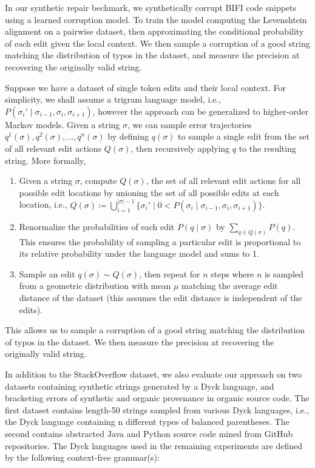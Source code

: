 \documentclass[sigplan,review,anonymous,acmsmall]{acmart}\settopmatter{printfolios=false,printccs=false,printacmref=false}
\begin{document}
  In our synthetic repair bechmark, we synthetically corrupt BIFI code snippets using a learned corruption model. To train the model computing the Levenshtein alignment on a pairwise dataset, then approximating the conditional probability of each edit given the local context. We then sample a corruption of a good string matching the distribution of typos in the dataset, and measure the precision at recovering the originally valid string.

  Suppose we have a dataset of single token edits and their local context. For simplicity, we shall assume a trigram language model, i.e., $P(\sigma_i' \mid \sigma_{i-1}, \sigma_i, \sigma_{i+1})$, however the approach can be generalized to higher-order Markov models. Given a string $\sigma$, we can sample error trajectories $q^1(\sigma), q^2(\sigma), \ldots, q^n(\sigma)$ by defining $q(\sigma)$ to sample a single edit from the set of all relevant edit actions $Q(\sigma)$, then recursively applying $q$ to the resulting string. More formally,

  \begin{enumerate}
    \item Given a string $\sigma$, compute $Q(\sigma)$, the set of all relevant edit actions for all possible edit locations by unioning the set of all possible edits at each location, i.e., $Q(\sigma) \coloneqq \bigcup_{i=1}^{|\sigma| - 1} \big\{\sigma_i' \mid  0 < P(\sigma_i \mid \sigma_{i-1}, \sigma_i, \sigma_{i+1})\big\}$.
    \item Renormalize the probabilities of each edit $P(q \mid \sigma)$ by $\sum_{q \in Q(\sigma)} P(q)$. This ensures the probability of sampling a particular edit is proportional to its relative probability under the language model and sums to 1.
    \item Sample an edit $q(\sigma) \sim Q(\sigma)$, then repeat for $n$ steps where $n$ is sampled from a geometric distribution with mean $\mu$ matching the average edit distance of the dataset (this assumes the edit distance is independent of the edits).
  \end{enumerate}

  This allows us to sample a corruption of a good string matching the distribution of typos in the dataset. We then measure the precision at recovering the originally valid string.

  In addition to the StackOverflow dataset, we also evaluate our approach on two datasets containing synthetic strings generated by a Dyck language, and bracketing errors of synthetic and organic provenance in organic source code. The first dataset contains length-50 strings sampled from various Dyck languages, i.e., the Dyck language containing n different types of balanced parentheses. The second contains abstracted Java and Python source code mined from GitHub repositories. The Dyck languages used in the remaining experiments are defined by the following context-free grammar(s):
\end{document}
